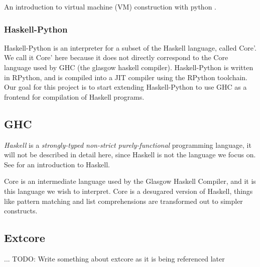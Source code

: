 An introduction to virtual machine (VM) construction with python \cite{pypy}.

\subsubsection{Haskell-Python}

Haskell-Python is an interpreter for a subset of the Haskell language, called Core'.
We call it Core' here because it does not directly correspond to the Core language
used by GHC (the glasgow haskell compiler). Haskell-Python is written in RPython,
and is compiled into a JIT compiler using the RPython toolchain. Our goal for this
project is to start extending Haskell-Python to use GHC as a frontend for compilation 
of Haskell programs.

\subsection{GHC}

\emph{Haskell} is a \emph{strongly-typed non-strict purely-functional} programming language, it will not be
described in detail here, since Haskell is not the language we focus on. See \cite{hudak1992report}
for an introduction to Haskell. 

Core is an intermediate language used by the Glasgow Haskell Compiler\cite{ghc},
and it is this language we wish to interpret. Core is a desugared version of Haskell, things like pattern matching
and list comprehensions are transformed out to simpler constructs.\cite{jones1994compilation}

\subsection{Extcore}

... TODO: Write something about extcore as it is being referenced later

